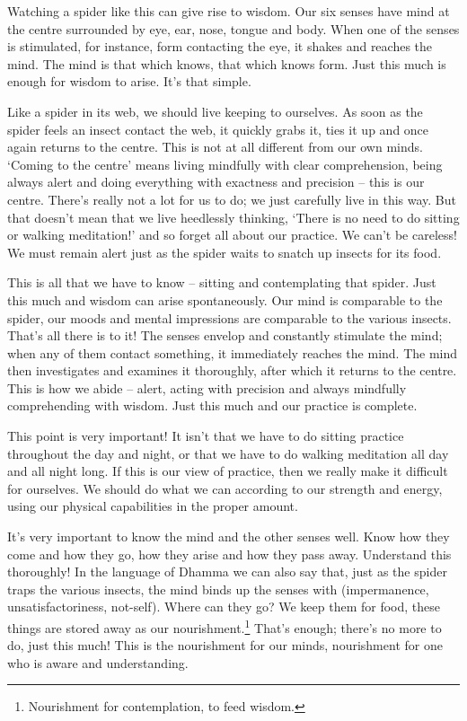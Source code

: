 Watching a spider like this can give rise to wisdom. Our six senses have mind at the centre surrounded by eye, ear, nose, tongue and body. When one of the senses is stimulated, for instance, form contacting the eye, it shakes and reaches the mind. The mind is that which knows, that which knows form. Just this much is enough for wisdom to arise. It's that simple.
 
Like a spider in its web, we should live keeping to ourselves. As soon as the spider feels an insect contact the web, it quickly grabs it, ties it up and once again returns to the centre. This is not at all different from our own minds. `Coming to the centre' means living mindfully with clear comprehension, being always alert and doing everything with exactness and precision -- this is our centre. There's really not a lot for us to do; we just carefully live in this way. But that doesn't mean that we live heedlessly thinking, `There is no need to do sitting or walking meditation!' and so forget all about our practice. We can't be careless! We must remain alert just as the spider waits to snatch up insects for its food. 

This is all that we have to know -- sitting and contemplating that spider. Just this much and wisdom can arise spontaneously. Our mind is comparable to the spider, our moods and mental impressions are comparable to the various insects. That's all there is to it! The senses envelop and constantly stimulate the mind; when any of them contact something, it immediately reaches the mind. The mind then investigates and examines it thoroughly, after which it returns to the centre. This is how we abide -- alert, acting with precision and always mindfully comprehending with wisdom. Just this much and our practice is complete. 

This point is very important! It isn't that we have to do sitting practice throughout the day and night, or that we have to do walking meditation all day and all night long. If this is our view of practice, then we really make it difficult for ourselves. We should do what we can according to our strength and energy, using our physical capabilities in the proper amount. 

It's very important to know the mind and the other senses well. Know how they come and how they go, how they arise and how they pass away. Understand this thoroughly! In the language of Dhamma we can also say that, just as the spider traps the various insects, the mind binds up the senses with  (impermanence, unsatisfactoriness, not-self). Where can they go? We keep them for food, these things are stored away as our nourishment.\footnote{Nourishment for contemplation, to feed wisdom.} That's enough; there's no more to do, just this much! This is the nourishment for our minds, nourishment for one who is aware and understanding. 

